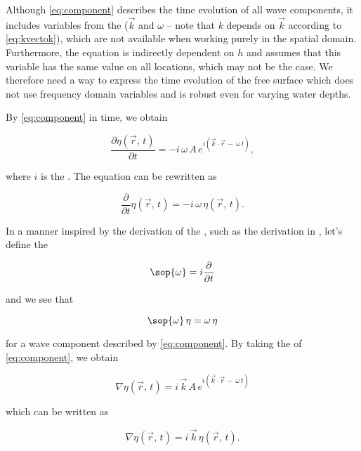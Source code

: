 Although \eqref{eq:component} describes the time evolution of all wave components, it includes variables from the  ($\vec{k}$ and $\omega$ -- note that $k$ depends on $\vec{k}$ according to \eqref{eq:kvectok}), which are not available when working purely in the spatial domain. Furthermore, the equation is indirectly dependent on $h$ and assumes that this variable has the same value on all locations, which may not be the case. We therefore need a way to express the time evolution of the free surface which does not use frequency domain variables and is robust even for varying water depths.

By  \eqref{eq:component} in time, we obtain

\begin{equation}
\frac{\partial\eta(\vec{r},\,t)}{\partial t} = -i\,\omega\,A\,e^{i(\vec{k}\cdot\vec{r}\,-\,\omega\,t)},
\end{equation}

where $i$ is the . The equation can be rewritten as

\begin{equation}
\frac{\partial}{\partial t}\eta(\vec{r},\,t) = -i\,\omega\,\eta(\vec{r},\,t).
\end{equation}

In a manner inspired by the derivation of the , such as the derivation in \citep{Bransden2000}, let's define the 

\begin{equation} \label{eq:opomega}
\sop{\omega} = i\frac{\partial}{\partial t}
\end{equation}

and we see that

\begin{equation} \label{eq:opomegaaction}
\sop{\omega}\,\eta = \omega\,\eta
\end{equation}

for a wave component described by \eqref{eq:component}. By taking the  of \eqref{eq:component}, we obtain

\begin{equation}
\nabla\eta(\vec{r},\,t) = i\,\vec{k}\,A\,e^{i(\vec{k}\cdot\vec{r}\,-\,\omega\,t)}
\end{equation}

which can be written as

\begin{equation}
\nabla\eta(\vec{r},\,t) = i\,\vec{k}\,\eta(\vec{r},\,t).
\end{equation}

